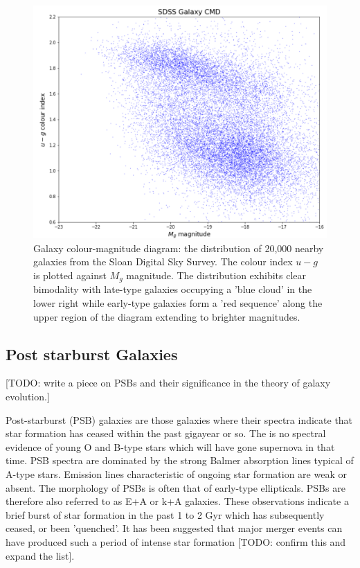 \begin{figure}
	\includegraphics[width=\columnwidth]{images/CMDs/galaxyCMD.PNG}
    \caption{Galaxy colour-magnitude diagram: the distribution of 20,000 nearby galaxies from the Sloan Digital Sky Survey. The colour index $u-g$ is plotted against $M_g$ magnitude. The distribution exhibits clear bimodality with late-type galaxies occupying a 'blue cloud' in the lower right while early-type galaxies form a 'red sequence' along the upper region of the diagram extending to brighter magnitudes.}
    \label{fig:CMD1}
\end{figure}

\subsection{Post starburst Galaxies}

[TODO: write a piece on PSBs and their significance in the theory of galaxy evolution.]

Post-starburst (PSB) galaxies are those galaxies where their spectra indicate that star formation has ceased within the past gigayear or so. The is no spectral evidence of young O and B-type stars which will have gone supernova in that time. PSB spectra are dominated by the strong Balmer absorption lines typical of A-type stars. Emission lines characteristic of ongoing star formation are weak or absent. The morphology of PSBs is often that of early-type ellipticals. PSBs are therefore also referred to as E+A or k+A galaxies. These observations indicate a brief burst of star formation in the past 1 to 2 Gyr which has subsequently ceased, or been 'quenched'. It has been suggested that major merger events can have produced such a period of intense star formation \citep{2012MNRAS.420..672S} [TODO: confirm this and expand the list].

